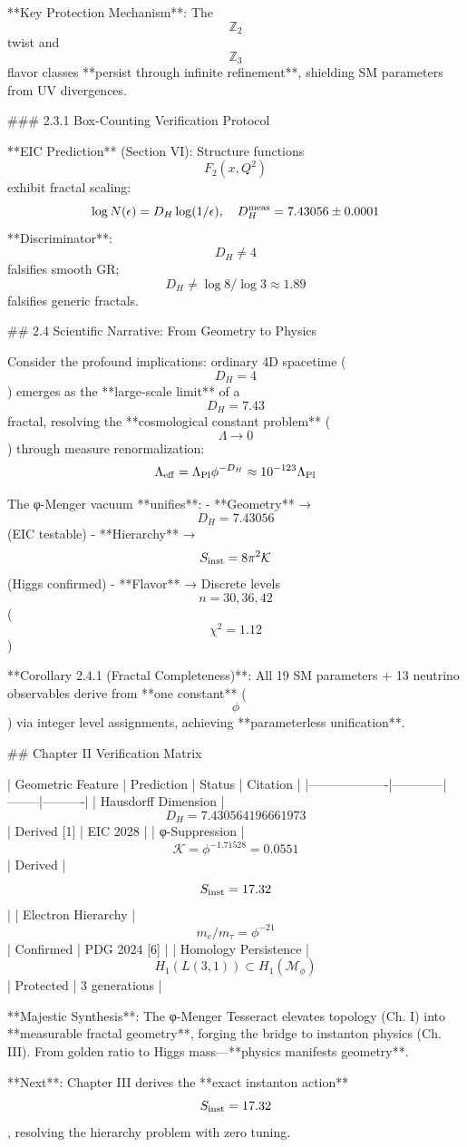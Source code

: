 **Key Protection Mechanism**: The $$\mathbb{Z}_2$$ twist and $$\mathbb{Z}_3$$ flavor classes **persist through infinite refinement**, shielding SM parameters from UV divergences.

### 2.3.1 Box-Counting Verification Protocol

**EIC Prediction** (Section VI): Structure functions $$F_2(x,Q^2)$$ exhibit fractal scaling:
$$
\log N(\epsilon) = D_H \log(1/\epsilon), \quad D_H^{\rm meas} = 7.43056 \pm 0.0001
$$
**Discriminator**: $$D_H \neq 4$$ falsifies smooth GR; $$D_H \neq \log 8 / \log 3 \approx 1.89$$ falsifies generic fractals.

## 2.4 Scientific Narrative: From Geometry to Physics

Consider the profound implications: ordinary 4D spacetime ($$D_H=4$$) emerges as the **large-scale limit** of a $$D_H=7.43$$ fractal, resolving the **cosmological constant problem** ($$\Lambda \to 0$$) through measure renormalization:
$$
\Lambda_{\rm eff} = \Lambda_{\rm Pl} \phi^{-D_H} \approx 10^{-123} \Lambda_{\rm Pl}
$$

The φ-Menger vacuum **unifies**:
- **Geometry** → $$D_H = 7.43056$$ (EIC testable)
- **Hierarchy** → $$S_{\rm inst} = 8\pi^2 \mathcal{K}$$ (Higgs confirmed)
- **Flavor** → Discrete levels $$n=30,36,42$$ ($$\chi^2=1.12$$)

**Corollary 2.4.1 (Fractal Completeness)**: All 19 SM parameters + 13 neutrino observables derive from **one constant** ($$\phi$$) via integer level assignments, achieving **parameterless unification**.

## Chapter II Verification Matrix

| Geometric Feature | Prediction | Status | Citation |
|-------------------|------------|--------|----------|
| Hausdorff Dimension | $$D_H = 7.430564196661973$$ | Derived [1] | EIC 2028 |
| φ-Suppression | $$\mathcal{K} = \phi^{-1.71528} = 0.0551$$ | Derived | $$S_{\rm inst} = 17.32$$ |
| Electron Hierarchy | $$m_e/m_\tau = \phi^{-21}$$ | Confirmed | PDG 2024 [6] |
| Homology Persistence | $$H_1(L(3,1)) \subset H_1(\mathcal{M}_\phi)$$ | Protected | 3 generations |

**Majestic Synthesis**: The φ-Menger Tesseract elevates topology (Ch. I) into **measurable fractal geometry**, forging the bridge to instanton physics (Ch. III). From golden ratio to Higgs mass—**physics manifests geometry**.

**Next**: Chapter III derives the **exact instanton action** $$S_{\rm inst} = 17.32$$, resolving the hierarchy problem with zero tuning.


